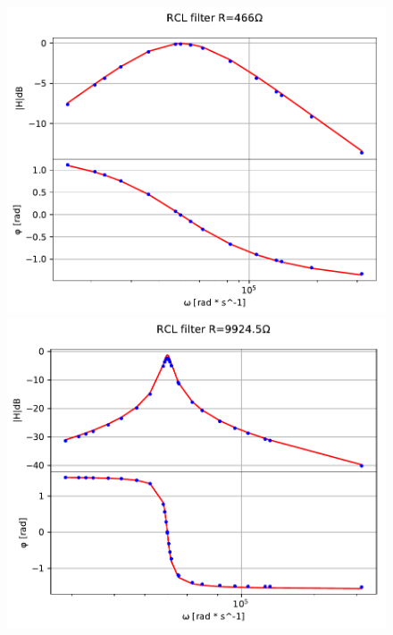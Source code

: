 \documentclass{article}
\begin{document}
\begin{figure}[H]
    \centering
    \begin{minipage}{0.5\textwidth}
        \centering
        \includegraphics[width=\textwidth]{bodefilter1.pdf} 
    \end{minipage}\hfill
    \begin{minipage}{0.5\textwidth}
        \centering
        \includegraphics[width=\textwidth]{bodefilter2.pdf} 
    \end{minipage}
    \\

\end{figure}
\end{document}

